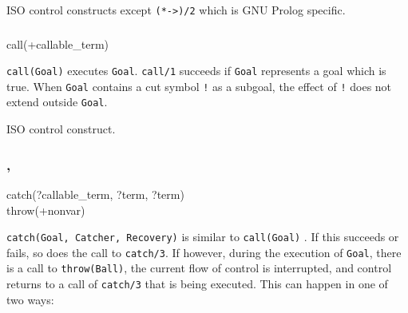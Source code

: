 \Portability

ISO control constructs except \texttt{(*->)/2} which is GNU Prolog specific.

\subsubsection{ \label{call/1}}

\begin{TemplatesOneCol}
call(+callable\_term)

\end{TemplatesOneCol}

\Description

\texttt{call(Goal)} executes \texttt{Goal}. \texttt{call/1} succeeds if
\texttt{Goal} represents a goal which is true. When \texttt{Goal} contains a
cut symbol \texttt{!}  as a subgoal, the effect of
\texttt{!} does not extend outside \texttt{Goal}.

\begin{PlErrors}




\end{PlErrors}

\Portability

ISO control construct.

\subsubsection{,
                \label{catch/3}}

\begin{TemplatesOneCol}
catch(?callable\_term, ?term, ?term)\\
throw(+nonvar)

\end{TemplatesOneCol}

\Description

\texttt{catch(Goal, Catcher, Recovery)} is similar to \texttt{call(Goal)}
. If this succeeds or fails, so does the call to
\texttt{catch/3}. If however, during the execution of \texttt{Goal}, there
is a call to \texttt{throw(Ball)}, the current flow of control is
interrupted, and control returns to a call of \texttt{catch/3} that is being
executed. This can happen in one of two ways:

